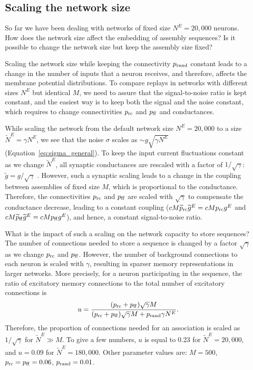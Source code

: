   \subsection{Scaling the network size}
    So far we have been dealing with networks of fixed size $N^E=20,000$
    neurons. How does the network size affect the embedding of assembly
    sequences? Is it possible to change the network size but keep the assembly
    size fixed?

    Scaling the network size while keeping the connectivity $p_{\rm rand}$
    constant leads to a change in the number of inputs that a neuron receives,
    and therefore, affects the membrane potential distributions.  To compare
    replays in networks with different sizes $N^E$ but identical $M$, we need
    to assure that the signal-to-noise ratio is kept constant, and the easiest
    way is to keep both the signal and the noise constant, which requires to
    change connectivities $p_{\rm rc}$ and $p_{\rm ff}$ and conductances.
    
    While scaling the network from the default network size $N^E=20,000$ to a
    size $\widetilde{N}^E=\gamma N^E$, we see that the noise $\sigma$ scales as
    $ \sim g \sqrt{\gamma N^E}$ (Equation~\ref{eq:sigma_general}). To keep the input
    current fluctuations constant as we change $\widetilde{N}^E$, all synaptic
    conductances are rescaled with a factor of $1/\sqrt{\gamma}$:
    $\widetilde{g}=g/\sqrt{\gamma}$ \citep{vanVreeswijk1996}. However, such a
    synaptic scaling leads to a change in the coupling between assemblies of
    fixed size $M$, which is proportional to the conductance. Therefore, the
    connectivities $p_{\rm rc}$ and $p_{\rm ff}$ are scaled with
    $\sqrt{\gamma}$ to compensate the conductance decrease, leading to a
    constant coupling ($cM\widetilde{p}_{\rm rc}\widetilde{g}^E = cMp_{\rm
    rc}g^E$ and $cM\widetilde{p}_{\rm ff}\widetilde{g}^E = cMp_{\rm ff}g^E$),
    and hence, a constant signal-to-noise ratio.

    What is the impact of such a scaling on the network capacity to store
    sequences? The number of connections needed to store a sequence is changed
    by a factor $\sqrt{\gamma}$ as we change $p_{\rm rc}$ and $p_{\rm ff}$.
    However, the number of background connections to each neuron is scaled with
    $\gamma$, resulting in sparser memory representations in larger networks.
    More precisely, for a neuron participating in the sequence, the ratio of
    excitatory memory connections to the total number of excitatory connections
    is 
    \[
      u=\frac{(p_{\rm rc}+p_{\rm ff})\sqrt{\gamma}M}{(p_{\rm rc}+p_{\rm ff})\sqrt{\gamma}M + p_{\rm rand} \gamma N^E } . 
    \]
    Therefore, the proportion of connections needed for an association is
    scaled as $1/\sqrt{\gamma}$ for $\widetilde{N}^E \gg M$. To give a few
    numbers, $u$ is equal to 0.23 for $\widetilde{N}^E=20,000$, and $u=0.09$
    for $\widetilde{N}^E = 180,000$. Other parameter values are: $M=500$,
    $p_{\rm rc}=p_{\rm ff}=0.06$, $p_{\rm rand}=0.01$.

